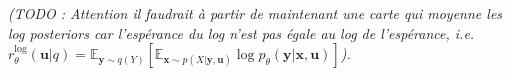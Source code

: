 




\emph{(TODO : Attention il faudrait à partir de maintenant une carte qui moyenne les log posteriors car l'espérance du log n'est pas  égale au log de l'espérance, i.e. $r_{\theta}^{\text{log}}(\boldsymbol{u}|q) = \mathbb{E}_{\boldsymbol{y}\sim q(Y)} \left[\mathbb{E}_{ \boldsymbol{x} \sim p(X|\boldsymbol{y}, \boldsymbol{u})}  \log p_\theta(\boldsymbol{y}|\boldsymbol{x}, \boldsymbol{u}) \right]$).}
\newline
